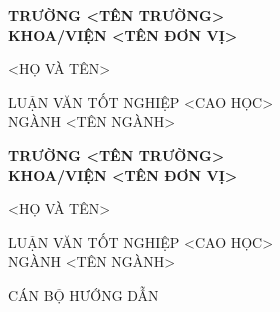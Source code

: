 \begin{center}\bfseries
	TRƯỜNG <TÊN TRƯỜNG>\\
	KHOA/VIỆN <TÊN ĐƠN VỊ>\par\vfill

	<HỌ VÀ TÊN>\par\vfill

	{\Large <TÊN ĐỀ TÀI>}\par\vfill

	LUẬN VĂN TỐT NGHIỆP <CAO HỌC>\\NGÀNH <TÊN NGÀNH>\par\vfill

	\the\year{}\par
\end{center}
\cleardoublepage

\begin{center}\bfseries
	TRƯỜNG <TÊN TRƯỜNG>\\
	KHOA/VIỆN <TÊN ĐƠN VỊ>\par\vfill

	<HỌ VÀ TÊN>\par\vfill

	{\Large <TÊN ĐỀ TÀI>}\par\vfill

	LUẬN VĂN TỐT NGHIỆP <CAO HỌC>\\NGÀNH <TÊN NGÀNH>\par\vfill

	CÁN BỘ HƯỚNG DẪN\\<HỌ VÀ TÊN CBHD>\par\vfill

	\the\year{}\par
\end{center}
